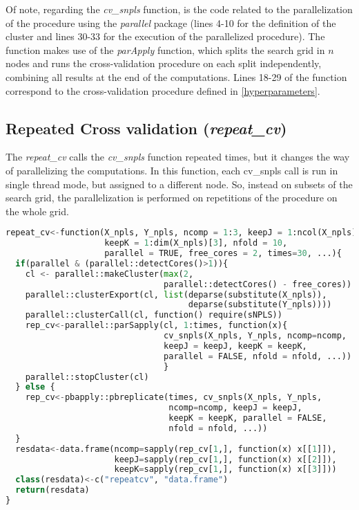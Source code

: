 Of note, regarding the \textit{cv\_snpls} function, is the code related to the parallelization of the procedure using the \textit{parallel} package (lines 4-10 for the definition of the cluster and lines 30-33 for the execution of the parallelized procedure). The function makes use of the \textit{parApply} function, which splits the search grid in $n$ nodes and runs the cross-validation procedure on each split independently, combining all results at the end of the computations. Lines 18-29 of the function correspond to the cross-validation procedure defined in \autoref{hyperparameters}.

\subsection{Repeated Cross validation (\textit{repeat\_cv})}
\label{repeatcv}
The \textit{repeat\_cv} calls the \textit{cv\_snpls} function repeated times, but it changes the way of parallelizing the computations. In this function, each cv\_snpls call is run in single thread mode, but assigned to a different node. So, instead on subsets of the search grid, the parallelization is performed on repetitions of the procedure on the whole grid.
\vspace{15pt}
\begin{lstlisting}[language=Python, caption=Repeated cross validation function]
repeat_cv<-function(X_npls, Y_npls, ncomp = 1:3, keepJ = 1:ncol(X_npls), 
                    keepK = 1:dim(X_npls)[3], nfold = 10, 
                    parallel = TRUE, free_cores = 2, times=30, ...){
  if(parallel & (parallel::detectCores()>1)){
    cl <- parallel::makeCluster(max(2, 
                                parallel::detectCores() - free_cores))
    parallel::clusterExport(cl, list(deparse(substitute(X_npls)), 
                                     deparse(substitute(Y_npls))))
    parallel::clusterCall(cl, function() require(sNPLS))
    rep_cv<-parallel::parSapply(cl, 1:times, function(x){
                                cv_snpls(X_npls, Y_npls, ncomp=ncomp, 
                                keepJ = keepJ, keepK = keepK, 
                                parallel = FALSE, nfold = nfold, ...))
                                }
    parallel::stopCluster(cl)
  } else {
    rep_cv<-pbapply::pbreplicate(times, cv_snpls(X_npls, Y_npls, 
                                 ncomp=ncomp, keepJ = keepJ, 
                                 keepK = keepK, parallel = FALSE, 
                                 nfold = nfold, ...))
  }
  resdata<-data.frame(ncomp=sapply(rep_cv[1,], function(x) x[[1]]), 
                      keepJ=sapply(rep_cv[1,], function(x) x[[2]]),
                      keepK=sapply(rep_cv[1,], function(x) x[[3]]))
  class(resdata)<-c("repeatcv", "data.frame")
  return(resdata)
}
\end{lstlisting}


